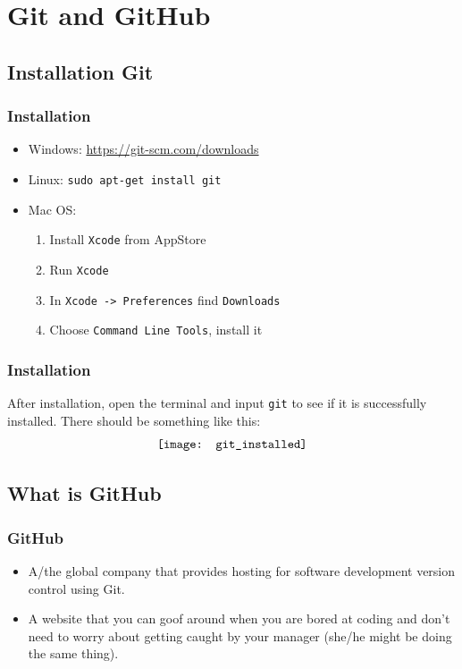 \documentclass{beamer}
\begin{document}
	\section{Git and GitHub}
		\subsection{Installation Git}
			\begin{frame}
				\frametitle{Installation}
				\begin{itemize}
					\item Windows: \url{https://git-scm.com/downloads}
					\item Linux: \texttt{sudo apt-get install git}
					\item Mac OS: 
						\begin{enumerate}
							\item Install \texttt{Xcode} from AppStore 
							\item Run \texttt{Xcode} 
							\item In \texttt{Xcode -> Preferences} find \texttt{Downloads} 
							\item Choose \texttt{Command Line Tools}, install it
						\end{enumerate}					
				\end{itemize}
			\end{frame}

			\begin{frame}
				\frametitle{Installation}
				After installation, open the terminal and input \texttt{git} to see if it is successfully installed. There should be something like this:
				\begin{align}
					\centering
					\texttt{[image: git\_installed]} \nonumber
				\end{align}
			\end{frame}

		\subsection{What is GitHub}
			\begin{frame}
				\frametitle{GitHub}
				\begin{itemize}
					\item A/the global company that provides hosting for software development version control using Git.
					\item A website that you can goof around when you are bored at coding and don't need to worry about getting caught by your manager (she/he might be doing the same thing).
				\end{itemize}
			\end{frame}
\end{document}
